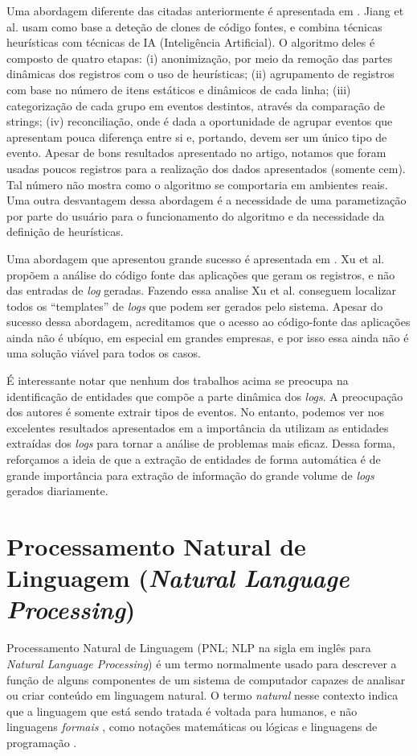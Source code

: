 \documentclass[
	12pt,				%
	openright,			%
	twoside,			%
	a4paper,			%
	english,			%
	spanish,			%
	brazil,				%
	]{abntex2}
\begin{document}
Uma abordagem diferente das citadas anteriormente é apresentada em \cite{jiang2008automated}. Jiang et al. usam como base a deteção de clones de código fontes, e combina técnicas heurísticas com técnicas de IA (Inteligência Artificial).  O algoritmo deles é composto de quatro etapas: (i) anonimização, por meio da remoção das partes dinâmicas dos registros com o uso de heurísticas; (ii) agrupamento de registros com base no número de itens estáticos e dinâmicos de cada linha; (iii) categorização de cada grupo em eventos destintos, através da comparação de strings; (iv) reconciliação, onde é dada a oportunidade de agrupar eventos que apresentam pouca diferença entre si e, portando, devem ser um único tipo de evento. Apesar de bons resultados apresentado no artigo, notamos que foram usadas poucos registros para a realização dos dados apresentados (somente cem). Tal número não mostra como o algoritmo se comportaria em ambientes reais. Uma outra desvantagem dessa abordagem é a necessidade de uma parametização por parte do usuário para o funcionamento do algoritmo e da necessidade da definição de heurísticas.

Uma abordagem que apresentou grande sucesso é apresentada em \cite{xu2009detecting}. Xu et al. propõem a análise do código fonte das aplicações que geram os registros, e não das entradas de \emph{log} geradas. Fazendo essa analise Xu et al. conseguem localizar todos os ``templates'' de \emph{logs} que podem ser gerados pelo sistema. Apesar do sucesso dessa abordagem, acreditamos que o acesso ao código-fonte das aplicações ainda não é ubíquo, em especial em grandes empresas, e por isso essa ainda não é uma solução viável para todos os casos.

É interessante notar que nenhum dos trabalhos acima se preocupa na identificação de entidades que compõe a parte dinâmica dos \emph{logs}. A preocupação dos autores é somente extrair tipos de eventos. No entanto, podemos ver nos excelentes resultados apresentados em \cite{xu2008mining,yen2013beehive} a importância da utilizam as entidades extraídas dos \emph{logs} para tornar a análise de problemas mais eficaz. Dessa forma, reforçamos a ideia de que a extração de entidades de forma automática é de grande importância para extração de informação do grande volume de \emph{logs} gerados diariamente.

\section{Processamento Natural de Linguagem (\emph{Natural Language Processing})}
Processamento Natural de Linguagem (PNL; NLP na sigla em inglês para \emph{Natural Language Processing}) é um termo normalmente usado para descrever a função de alguns componentes de um sistema de computador capazes de analisar ou criar conteúdo em linguagem natural. O termo \emph{natural} nesse contexto indica que a linguagem que está sendo tratada é voltada para humanos, e não linguagens \emph{formais} , como notações matemáticas ou lógicas e linguagens de programação \cite{jackson2002natural}.
\end{document}
